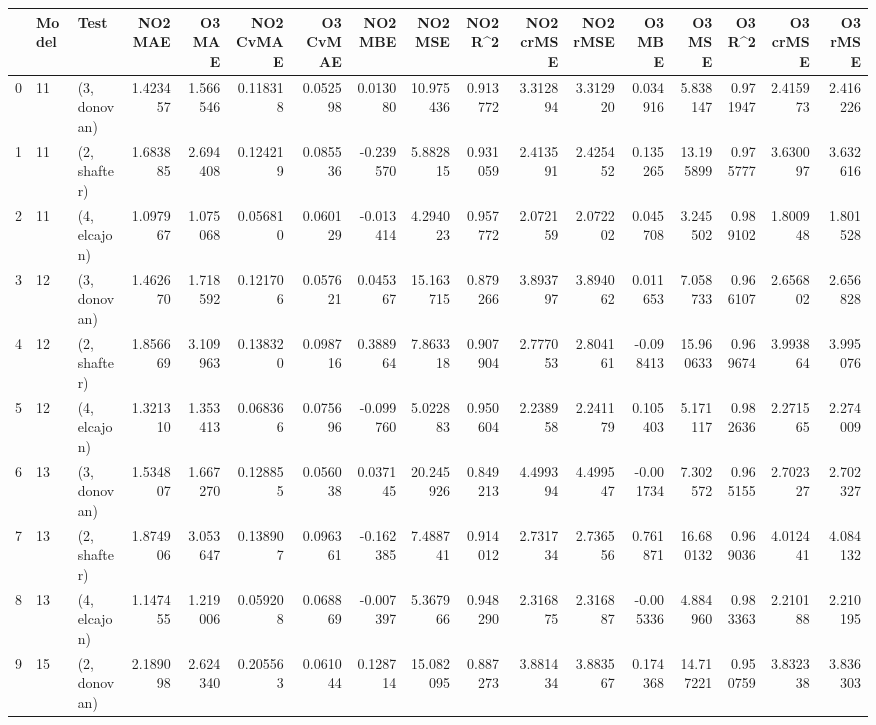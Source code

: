 \begin{tabular}{lllrrrrrrrrrrrrrr}
\toprule
{} & Model &          Test &   NO2 MAE &    O3 MAE &  NO2 CvMAE &  O3 CvMAE &   NO2 MBE &    NO2 MSE &   NO2 R\textasciicircum2 &  NO2 crMSE &  NO2 rMSE &    O3 MBE &     O3 MSE &    O3 R\textasciicircum2 &  O3 crMSE &   O3 rMSE \\
\midrule
0  &    11 &  (3, donovan) &  1.423457 &  1.566546 &   0.118318 &  0.052598 &  0.013080 &  10.975436 &  0.913772 &   3.312894 &  3.312920 &  0.034916 &   5.838147 &  0.971947 &  2.415973 &  2.416226 \\
1  &    11 &  (2, shafter) &  1.683885 &  2.694408 &   0.124219 &  0.085536 & -0.239570 &   5.882815 &  0.931059 &   2.413591 &  2.425452 &  0.135265 &  13.195899 &  0.975777 &  3.630097 &  3.632616 \\
2  &    11 &  (4, elcajon) &  1.097967 &  1.075068 &   0.056810 &  0.060129 & -0.013414 &   4.294023 &  0.957772 &   2.072159 &  2.072202 &  0.045708 &   3.245502 &  0.989102 &  1.800948 &  1.801528 \\
3  &    12 &  (3, donovan) &  1.462670 &  1.718592 &   0.121706 &  0.057621 &  0.045367 &  15.163715 &  0.879266 &   3.893797 &  3.894062 &  0.011653 &   7.058733 &  0.966107 &  2.656802 &  2.656828 \\
4  &    12 &  (2, shafter) &  1.856669 &  3.109963 &   0.138320 &  0.098716 &  0.388964 &   7.863318 &  0.907904 &   2.777053 &  2.804161 & -0.098413 &  15.960633 &  0.969674 &  3.993864 &  3.995076 \\
5  &    12 &  (4, elcajon) &  1.321310 &  1.353413 &   0.068366 &  0.075696 & -0.099760 &   5.022883 &  0.950604 &   2.238958 &  2.241179 &  0.105403 &   5.171117 &  0.982636 &  2.271565 &  2.274009 \\
6  &    13 &  (3, donovan) &  1.534807 &  1.667270 &   0.128855 &  0.056038 &  0.037145 &  20.245926 &  0.849213 &   4.499394 &  4.499547 & -0.001734 &   7.302572 &  0.965155 &  2.702327 &  2.702327 \\
7  &    13 &  (2, shafter) &  1.874906 &  3.053647 &   0.138907 &  0.096361 & -0.162385 &   7.488741 &  0.914012 &   2.731734 &  2.736556 &  0.761871 &  16.680132 &  0.969036 &  4.012441 &  4.084132 \\
8  &    13 &  (4, elcajon) &  1.147455 &  1.219006 &   0.059208 &  0.068869 & -0.007397 &   5.367966 &  0.948290 &   2.316875 &  2.316887 & -0.005336 &   4.884960 &  0.983363 &  2.210188 &  2.210195 \\
9  &    15 &  (2, donovan) &  2.189098 &  2.624340 &   0.205563 &  0.061044 &  0.128714 &  15.082095 &  0.887273 &   3.881434 &  3.883567 &  0.174368 &  14.717221 &  0.950759 &  3.832338 &  3.836303 \\

\end{tabular}

